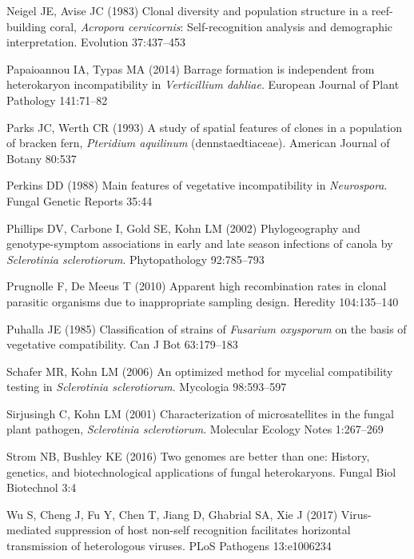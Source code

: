\hypertarget{ref-Neigel1983-gt}{}
Neigel JE, Avise JC (1983) Clonal diversity and population structure in
a reef-building coral, \emph{Acropora cervicornis}: Self-recognition
analysis and demographic interpretation. Evolution 37:437--453

\hypertarget{ref-Papaioannou2014-pe}{}
Papaioannou IA, Typas MA (2014) Barrage formation is independent from
heterokaryon incompatibility in \emph{Verticillium dahliae}. European Journal
of Plant Pathology 141:71--82

\hypertarget{ref-Parks1993-nv}{}
Parks JC, Werth CR (1993) A study of spatial features of clones in a
population of bracken fern, \emph{Pteridium aquilinum}
(dennstaedtiaceae). American Journal of Botany 80:537

\hypertarget{ref-Perkins1988-mt}{}
Perkins DD (1988) Main features of vegetative incompatibility in
\emph{Neurospora}. Fungal Genetic Reports 35:44

\hypertarget{ref-Phillips2002-pq}{}
Phillips DV, Carbone I, Gold SE, Kohn LM (2002) Phylogeography and
genotype-symptom associations in early and late season infections of
canola by \emph{Sclerotinia sclerotiorum}. Phytopathology 92:785--793

\hypertarget{ref-Prugnolle2010-yb}{}
Prugnolle F, De Meeus T (2010) Apparent high recombination rates in
clonal parasitic organisms due to inappropriate sampling design.
Heredity 104:135--140

\hypertarget{ref-Puhalla1985-bq}{}
Puhalla JE (1985) Classification of strains of \emph{Fusarium oxysporum} on the
basis of vegetative compatibility. Can J Bot 63:179--183

\hypertarget{ref-Schafer2006-ph}{}
Schafer MR, Kohn LM (2006) An optimized method for mycelial
compatibility testing in \emph{Sclerotinia sclerotiorum}. Mycologia
98:593--597

\hypertarget{ref-Sirjusingh2001-sq}{}
Sirjusingh C, Kohn LM (2001) Characterization of microsatellites in the
fungal plant pathogen, \emph{Sclerotinia sclerotiorum}. Molecular
Ecology Notes 1:267--269

\hypertarget{ref-Strom2016-di}{}
Strom NB, Bushley KE (2016) Two genomes are better than one: History,
genetics, and biotechnological applications of fungal heterokaryons.
Fungal Biol Biotechnol 3:4

\hypertarget{ref-Wu2017-dx}{}
Wu S, Cheng J, Fu Y, Chen T, Jiang D, Ghabrial SA, Xie J (2017)
Virus-mediated suppression of host non-self recognition facilitates
horizontal transmission of heterologous viruses. PLoS Pathogens
13:e1006234


